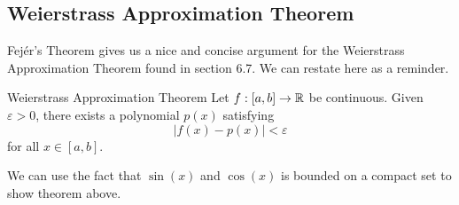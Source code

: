 \subsection{Weierstrass Approximation Theorem}

Fej\'{e}r's  Theorem gives us a nice and concise argument for the Weierstrass Approximation Theorem found in section 6.7. We can restate here as a reminder.

\begin{theorem}{Weierstrass Approximation Theorem}{}
    Let \( f : [a,b] \to \mathbb{R}  \) be continuous. Given \( \varepsilon > 0  \), there exists a polynomial \( p(x) \) satisfying 
    \[  | f(x) - p(x) | < \varepsilon \] for all \( x \in [a,b] \).
\end{theorem}

We can use the fact that \( \sin(x)  \) and \( \cos(x)  \) is bounded on a compact set to show theorem above.

